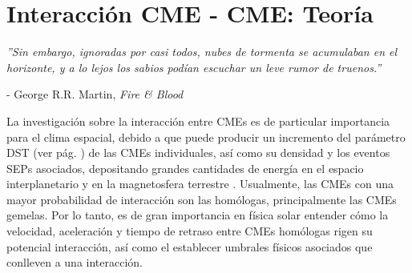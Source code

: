\chapter{Interacción CME - CME: Teoría}
\label{InteracciónCMECME}

\begin{flushright}
\begin{minipage}{0.6\textwidth}
\raggedleft 
\footnotesize\itshape
\setlength{\baselineskip}{12pt} 
\vspace{0.7cm} 
''Sin embargo, ignoradas por casi todos, nubes de tormenta se acumulaban en el horizonte, y a lo lejos los sabios podían escuchar un leve rumor de truenos.''

\medskip
\vspace{0.3cm} 
- George R.R. Martin, \textit{Fire \& Blood}
\end{minipage}
\end{flushright}
\vspace{1cm}

La investigación sobre la interacción entre CMEs es de particular importancia para el clima espacial, debido a que puede producir un incremento del parámetro \ac{DST} (ver pág. \pageref{DST}) de las CMEs individuales, así como su densidad y los eventos \acp{SEP} asociados, depositando grandes cantidades de energía en el espacio interplanetario y en la magnetosfera terrestre \parencite[e.g.,][]{lugaz-2014, farrugia-2004}. Usualmente, las CMEs con una mayor probabilidad de interacción son las homólogas, principalmente las CMEs gemelas. Por lo tanto, es de gran importancia en física solar entender cómo la velocidad, aceleración y tiempo de retraso entre CMEs homólogas rigen su potencial interacción, así como el establecer umbrales físicos asociados que conlleven a una interacción.

